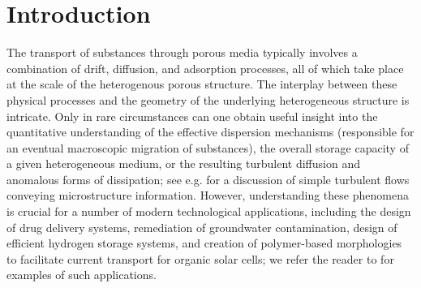 \documentclass[11pt]{article}
\begin{document}
\section{Introduction}\label{section_introduction}
The transport of substances through porous media typically involves a combination of drift, diffusion, and adsorption processes, all of which take place at the scale of the heterogenous porous structure. 
The interplay between these physical processes and the geometry of the underlying heterogeneous structure is intricate. 
Only in rare circumstances can one obtain useful insight into the quantitative understanding of the effective dispersion mechanisms (responsible for an eventual macroscopic migration of substances), the overall storage capacity of a given heterogeneous medium, or the resulting turbulent diffusion and anomalous forms of dissipation; see e.g. \cite{mclaughlin1985convection} for a discussion of simple turbulent flows conveying microstructure information.
However, understanding these phenomena is crucial for a number of modern technological applications, including the design of drug delivery systems, remediation of groundwater contamination, design of efficient hydrogen storage systems, and creation of polymer-based morphologies to facilitate current transport for organic solar cells; we refer the reader to \cite{Donovan_PLOS,hydrogen,PNAS} for examples of such applications. 
\end{document}
